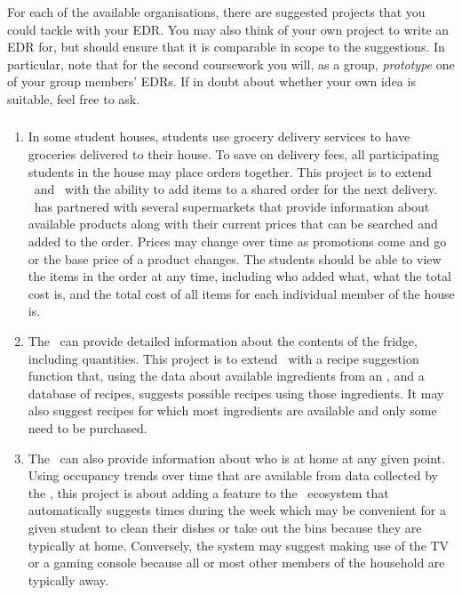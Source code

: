 For each of the available organisations, there are suggested projects that you could tackle with your EDR. You may also think of your own project to write an EDR for, but should ensure that it is comparable in scope to the suggestions. In particular, note that for the second coursework you will, as a group, \emph{prototype} one of your group members' EDRs. If in doubt about whether your own idea is suitable, feel free to ask.

\subsubsection{\sshFullName}

\begin{enumerate}
    \item In some student houses, students use grocery delivery services to have groceries delivered to their house. To save on delivery fees, all participating students in the house may place orders together. This project is to extend \sshConsole\ and \sshApp\ with the ability to add items to a shared order for the next delivery. \sshShortName\ has partnered with several supermarkets that provide information about available products along with their current prices that can be searched and added to the order. Prices may change over time as promotions come and go or the base price of a product changes. The students should be able to view the items in the order at any time, including who added what, what the total cost is, and the total cost of all items for each individual member of the house is.

    \item The \sshCamera\ can provide detailed information about the contents of the fridge, including quantities. This project is to extend \sshCloud\ with a recipe suggestion function that, using the data about available ingredients from an \sshCamera, and a database of recipes, suggests possible recipes using those ingredients. It may also suggest recipes for which most ingredients are available and only some need to be purchased.

    \item The \sshCamera\ can also provide information about who is at home at any given point. Using occupancy trends over time that are available from data collected by the \sshCamera, this project is about adding a feature to the \ssh\ ecosystem that automatically suggests times during the week which may be convenient for a given student to clean their dishes or take out the bins because they are typically at home. Conversely, the system may suggest making use of the TV or a gaming console because all or most other members of the household are typically away.
\end{enumerate}


